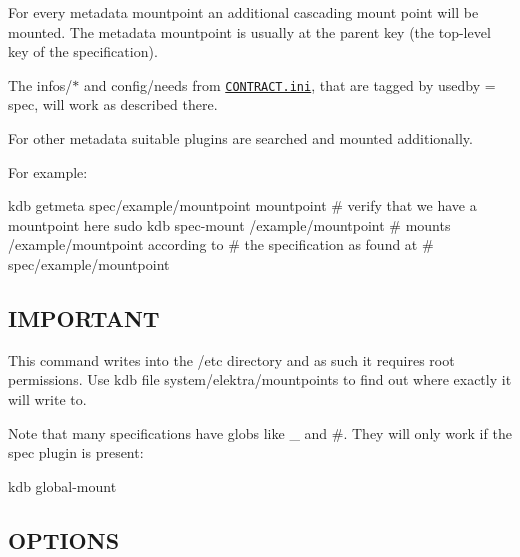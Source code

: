 \begin{DoxyItemize}
\item For every metadata {\ttfamily mountpoint} an additional cascading mount point will be mounted. The metadata {\ttfamily mountpoint} is usually at the parent key (the top-\/level key of the specification).
\item The {\ttfamily infos/$\ast$} and {\ttfamily config/needs} from \href{/home/markus/Projekte/Elektra/current/doc/CONTRACT.ini}{\tt C\+O\+N\+T\+R\+A\+C\+T.\+ini}, that are tagged by {\ttfamily usedby = spec}, will work as described there.
\item For other metadata suitable plugins are searched and mounted additionally.
\end{DoxyItemize}

For example\+:


\begin{DoxyCode}
kdb getmeta spec/example/mountpoint mountpoint  # verify that we have a mountpoint here
sudo kdb spec-mount /example/mountpoint  # mounts /example/mountpoint according to
                                         # the specification as found at
                                         # spec/example/mountpoint
\end{DoxyCode}


\subsection*{I\+M\+P\+O\+R\+T\+A\+NT}

This command writes into the {\ttfamily /etc} directory and as such it requires root permissions. Use {\ttfamily kdb file system/elektra/mountpoints} to find out where exactly it will write to.

Note that many specifications have globs like {\ttfamily \+\_\+} and {\ttfamily \#}. They will only work if the {\ttfamily spec} plugin is present\+:


\begin{DoxyCode}
kdb global-mount
\end{DoxyCode}


\subsection*{O\+P\+T\+I\+O\+NS}


